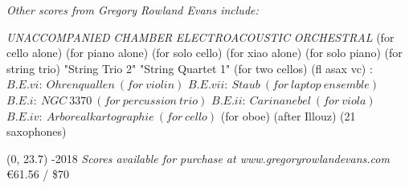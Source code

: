 \documentclass[10pt]{article}
\begin{document}

\vspace*{4\baselineskip}
\begin{center}
\textit{\fontsize{.7cm}{1em}\selectfont Other scores from Gregory Rowland Evans include:} \hfill
\end{center}
\vspace*{6\baselineskip}
{
\begin{center}
\setlength{\columnseprule}{1pt}
\setlength{\columnsep}{6em}

\begin{paracol}{4}
\textit{\fontsize{.4cm}{1em}\selectfont UNACCOMPANIED}
\switchcolumn[1]
\textit{\fontsize{.4cm}{1em}\selectfont CHAMBER}
\switchcolumn[2]
\textit{\fontsize{.4cm}{1em}\selectfont ELECTROACOUSTIC}
\switchcolumn[3]
\textit{\fontsize{.4cm}{1em}\selectfont ORCHESTRAL}
\switchcolumn[0]
\fontsize{.1cm}{0.5em}  (for cello alone)
\switchcolumn[0]
\fontsize{.1cm}{0.5em}  (for piano alone)
\switchcolumn[0]
\fontsize{.1cm}{0.5em}  (for solo cello)
 \switchcolumn[0]
\fontsize{.1cm}{0.5em}  (for xiao alone)
  \switchcolumn[0]
\fontsize{.1cm}{0.5em}  (for solo piano)
\switchcolumn[1]
\fontsize{.1cm}{0.5em} 
\switchcolumn[1]
\fontsize{.1cm}{0.5em} 
\switchcolumn[1]
\fontsize{.1cm}{0.5em}  (for string trio)
\switchcolumn[1]
\fontsize{.1cm}{0.5em}  "String Trio 2"
\switchcolumn[1]
\fontsize{.1cm}{0.5em}  "String Quartet 1"
\switchcolumn[1]
\fontsize{.1cm}{0.5em}  (for two cellos)
\switchcolumn[1]
\fontsize{.1cm}{0.5em}  (fl asax vc)
\switchcolumn[2]
\fontsize{.1cm}{0.5em} :
\switchcolumn[2]
\fontsize{.05cm}{0.5em} $B.E.vi: \ Ohrenquallen \ (for \ violin)$
\switchcolumn[2]
\fontsize{.05cm}{0.5em} $B.E.vii: \ Staub \ (for \ laptop \ ensemble)$
\switchcolumn[2]
\fontsize{.05cm}{0.5em} $B.E.i: \ NGC \ 3370 \ (for \ percussion \ trio)$
\switchcolumn[2]
\fontsize{.05cm}{0.5em} $B.E.ii: \ Carinanebel \ (for \ viola)$
\switchcolumn[2]
\fontsize{.05cm}{0.5em} $B.E.iv: \ Arborealkartographie \ (for \ cello)$
\switchcolumn[2]
\fontsize{.1cm}{0.5em}  (for oboe)
\switchcolumn[3]
\fontsize{.1cm}{0.5em} 
\switchcolumn[3]
\fontsize{.1cm}{0.5em}  (after Illouz)
\switchcolumn[3]
\fontsize{.1cm}{0.5em}  (21 saxophones)


\end{paracol}
\end{center}
}

\begin{textblock}{23}(0, 23.7)
-2018 \hfill
\textit{Scores available for purchase at www.gregoryrowlandevans.com} \hfill
\euro 61.56 / \$70
\end{textblock}
\end{document}
